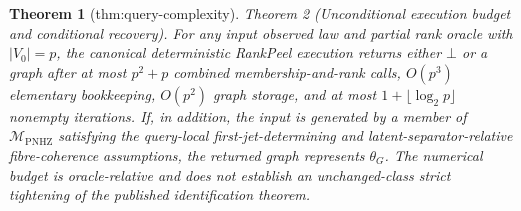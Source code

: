 \documentclass{article}
\newtheorem{theorem}{Theorem}
\begin{document}
\begin{theorem}[thm:query-complexity]\label{thm:query-complexity}
Theorem 2 (Unconditional execution budget and conditional recovery).  For any input observed law and partial rank oracle with \(|V_0|=p\), the canonical deterministic RankPeel execution returns either \(\bot\) or a graph after at most \(p^2+p\) combined membership-and-rank calls, \(O(p^3)\) elementary bookkeeping, \(O(p^2)\) graph storage, and at most \(1+\lfloor\log_2 p\rfloor\) nonempty iterations.  If, in addition, the input is generated by a member of \(\mathcal M_{\mathrm{PNHZ}}\) satisfying the query-local first-jet-determining and latent-separator-relative fibre-coherence assumptions, the returned graph represents \(\theta_G\).  The numerical budget is oracle-relative and does not establish an unchanged-class strict tightening of the published identification theorem.
\end{theorem}
\end{document}

